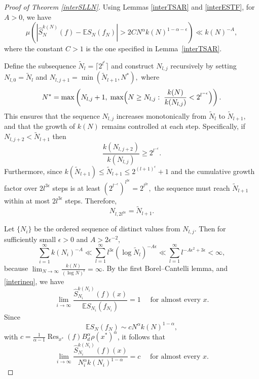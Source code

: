 \documentclass[11pt,twoside,a4paper,reqno]{amsart}
\newcommand{\E}{\mathbb{E}}
\begin{document}
\begin{proof}[Proof of Theorem \ref{interSLLN}]
Using Lemmas \ref{interTSAR} and \ref{interESTF}, for $A>0$, we have
\begin{equation}\label{interineq}
\mu \left( \left| \hat{S}_N^{k(N)}(f)-\E S_N(f_N) \right| >2C N^{\alpha} k(N)^{1-\alpha-\epsilon} \right) \ll k(N)^{-A},
\end{equation}
where the constant $C>1$ is the one specified in Lemma~\ref{interTSAR}.


Define the subsequence $\tilde{N}_l = \lceil 2^{l^{\epsilon}} \rceil$ and construct $N_{l,j}$ recursively by setting $N_{l,0} = \tilde{N}_l$ and $N_{l,j+1} = \min(\tilde{N}_{l+1},N^*),$ where
\begin{equation*}
N^* = \max\left(N_{l,j} + 1, \;\max\Bigl(N\geq N_{l,j}: \;\frac{k(N)}{k(N_{l,j})} < 2^{l^{-\epsilon}}\Bigr)\right).
\end{equation*}
This ensures that the sequence $N_{l,j}$ increases monotonically from $\tilde{N}_l$ to $\tilde{N}_{l+1},$ and that the growth of $k(N)$ remains controlled at each step. Specifically, if $N_{l,j+2}<\tilde{N}_{l+1}$ then
\begin{equation}\label{kNgrowth}
\frac{k(N_{l,j+2})}{k(N_{l,j})} \geq 2^{l^{-\epsilon}}.
\end{equation}
Furthermore, since $k(\tilde{N}_{l+1}) \leq \tilde{N}_{l+1} \leq 2^{(l+1)^{\epsilon}} + 1$ and the cumulative growth factor over $2 l^{3\epsilon}$ steps is at least $(2^{l^{-\epsilon}})^{l^{3\epsilon}} = 2^{l^{2\epsilon}},$ the sequence must reach $ \tilde{N}_{l+1}$ within at most $2 l^{3\epsilon}$ steps. Therefore,
\begin{equation*}
N_{l,2 l^{3\epsilon}} = \tilde{N}_{l+1}.
\end{equation*}

Let $\{N_i\}$ be the ordered sequence of distinct values from $N_{l,j}$. Then for sufficiently small $\epsilon>0$ and $A>2 \epsilon^{-2},$
\begin{equation}\label{kNsum}
\sum_{i=1}^{\infty} k(N_i)^{-A} \ll \sum_{l=1}^{\infty} l^{3\epsilon} (\log\tilde{N}_l)^{-A\epsilon} \ll \sum_{l=1}^{\infty} l^{-A \epsilon^2 + 3\epsilon} <\infty,
\end{equation}
because $\lim_{N\rightarrow \infty} \frac{k(N)}{(\log N)^{\epsilon}} = \infty$. By the first Borel--Cantelli lemma, and \eqref{interineq}, we have
\begin{equation}\label{kNE}
\lim_{i\rightarrow \infty} \frac{\hat{S}_{N_i}^{k(N_i)}(f)(x)}{\E S_{N_i}(f_{N_i})}=1 \quad \text{ for almost every } x.
\end{equation}
Since
\begin{equation*}
\E S_N(f_N) \sim c N^\alpha k(N)^{1-\alpha},
\end{equation*}
with $c=\frac{1}{\alpha-1} \operatorname{Res}_{x^*}(f)B_d^{\alpha} \rho(x^*)^{\alpha}$, it follows that
\begin{equation}\label{kNcon}
\lim_{i\rightarrow \infty} \frac{\hat{S}_{N_i}^{k(N_i)}(f)(x)}{N_i^{\alpha} k(N_i)^{1-\alpha}} = c \quad \text{ for almost every } x.
\end{equation}


\end{proof}
\end{document}
